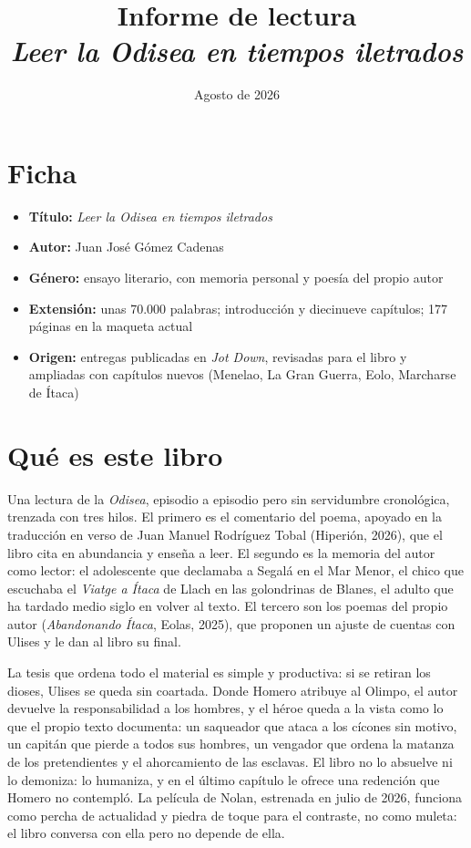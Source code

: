 \documentclass[12pt,a4paper]{article}
\title{Informe de lectura\\\large\emph{Leer la Odisea en tiempos iletrados}}
\author{}
\date{Agosto de 2026}
\begin{document}
\maketitle

\section*{Ficha}

\begin{itemize}
  \item \textbf{Título:} \emph{Leer la Odisea en tiempos iletrados}
  \item \textbf{Autor:} Juan José Gómez Cadenas
  \item \textbf{Género:} ensayo literario, con memoria personal y poesía del propio autor
  \item \textbf{Extensión:} unas 70.000 palabras; introducción y diecinueve capítulos; 177 páginas en la maqueta actual
  \item \textbf{Origen:} entregas publicadas en \emph{Jot Down}, revisadas para el libro y ampliadas con capítulos nuevos (Menelao, La Gran Guerra, Eolo, Marcharse de Ítaca)
\end{itemize}

\section*{Qué es este libro}

Una lectura de la \emph{Odisea}, episodio a episodio pero sin servidumbre cronológica, trenzada con tres hilos. El primero es el comentario del poema, apoyado en la traducción en verso de Juan Manuel Rodríguez Tobal (Hiperión, 2026), que el libro cita en abundancia y enseña a leer. El segundo es la memoria del autor como lector: el adolescente que declamaba a Segalá en el Mar Menor, el chico que escuchaba el \emph{Viatge a Ítaca} de Llach en las golondrinas de Blanes, el adulto que ha tardado medio siglo en volver al texto. El tercero son los poemas del propio autor (\emph{Abandonando Ítaca}, Eolas, 2025), que proponen un ajuste de cuentas con Ulises y le dan al libro su final.

La tesis que ordena todo el material es simple y productiva: si se retiran los dioses, Ulises se queda sin coartada. Donde Homero atribuye al Olimpo, el autor devuelve la responsabilidad a los hombres, y el héroe queda a la vista como lo que el propio texto documenta: un saqueador que ataca a los cícones sin motivo, un capitán que pierde a todos sus hombres, un vengador que ordena la matanza de los pretendientes y el ahorcamiento de las esclavas. El libro no lo absuelve ni lo demoniza: lo humaniza, y en el último capítulo le ofrece una redención que Homero no contempló. La película de Nolan, estrenada en julio de 2026, funciona como percha de actualidad y piedra de toque para el contraste, no como muleta: el libro conversa con ella pero no depende de ella.
\end{document}
